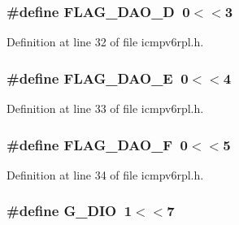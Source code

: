 \subsubsection[{\texorpdfstring{F\+L\+A\+G\+\_\+\+D\+A\+O\+\_\+D}{FLAG_DAO_D}}]{\setlength{\rightskip}{0pt plus 5cm}\#define F\+L\+A\+G\+\_\+\+D\+A\+O\+\_\+D~0$<$$<$3}\hypertarget{group___i_c_m_pv6_r_p_l_ga01f7a6ba5364891a303a8e725a170d12}{}\label{group___i_c_m_pv6_r_p_l_ga01f7a6ba5364891a303a8e725a170d12}


Definition at line 32 of file icmpv6rpl.\+h.

\subsubsection[{\texorpdfstring{F\+L\+A\+G\+\_\+\+D\+A\+O\+\_\+E}{FLAG_DAO_E}}]{\setlength{\rightskip}{0pt plus 5cm}\#define F\+L\+A\+G\+\_\+\+D\+A\+O\+\_\+E~0$<$$<$4}\hypertarget{group___i_c_m_pv6_r_p_l_ga106e764d5a7f433bf137362780da4ec8}{}\label{group___i_c_m_pv6_r_p_l_ga106e764d5a7f433bf137362780da4ec8}


Definition at line 33 of file icmpv6rpl.\+h.

\subsubsection[{\texorpdfstring{F\+L\+A\+G\+\_\+\+D\+A\+O\+\_\+F}{FLAG_DAO_F}}]{\setlength{\rightskip}{0pt plus 5cm}\#define F\+L\+A\+G\+\_\+\+D\+A\+O\+\_\+F~0$<$$<$5}\hypertarget{group___i_c_m_pv6_r_p_l_ga80b1a8bb01b3aa941d3c5c1b24056f1b}{}\label{group___i_c_m_pv6_r_p_l_ga80b1a8bb01b3aa941d3c5c1b24056f1b}


Definition at line 34 of file icmpv6rpl.\+h.

\subsubsection[{\texorpdfstring{G\+\_\+\+D\+IO}{G_DIO}}]{\setlength{\rightskip}{0pt plus 5cm}\#define G\+\_\+\+D\+IO~1$<$$<$7}\hypertarget{group___i_c_m_pv6_r_p_l_gac5915be92309eeeca33a95c1ec2d0d89}{}\label{group___i_c_m_pv6_r_p_l_gac5915be92309eeeca33a95c1ec2d0d89}


